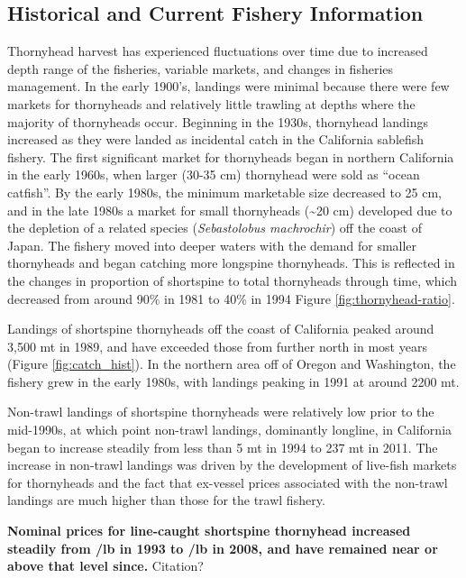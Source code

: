 \documentclass[11pt,
  english,
  letterpaper,
]{article}
\begin{document}
\hypertarget{historical-and-current-fishery-information}{%
\subsection{Historical and Current Fishery Information}\label{historical-and-current-fishery-information}}

Thornyhead harvest has experienced fluctuations over time due to increased depth range of the fisheries, variable markets, and changes in fisheries management. In the early 1900's, landings were minimal because there were few markets for thornyheads and relatively little trawling at depths where the majority of thornyheads occur. Beginning in the 1930s, thornyhead landings increased as they were landed as incidental catch in the California sablefish fishery. The first significant market for thornyheads began in northern California in the early 1960s, when larger (30-35 cm) thornyhead were sold as ``ocean catfish''. By the early 1980s, the minimum marketable size decreased to 25 cm, and in the late 1980s a market for small thornyheads (\textasciitilde20 cm) developed due to the depletion of a related species (\emph{Sebastolobus machrochir}) off the coast of Japan. The fishery moved into deeper waters with the demand for smaller thornyheads and began catching more longspine thornyheads. This is reflected in the changes in proportion of shortspine to total thornyheads through time, which decreased from around 90\% in 1981 to 40\% in 1994 Figure \ref{fig:thornyhead-ratio}.

Landings of shortspine thornyheads off the coast of California peaked around 3,500 mt in 1989, and have exceeded those from further north in most years (Figure \ref{fig:catch_hist}). In the northern area off of Oregon and Washington, the fishery grew in the early 1980s, with landings peaking in 1991 at around 2200 mt.

Non-trawl landings of shortspine thornyheads were relatively low prior to the mid-1990s, at which point non-trawl landings, dominantly longline, in California began to increase steadily from less than 5 mt in 1994 to 237 mt in 2011. The increase in non-trawl landings was driven by the development of live-fish markets for thornyheads and the fact that ex-vessel prices associated with the non-trawl landings are much higher than those for the trawl fishery.

\textbf{Nominal prices for line-caught shortspine thornyhead increased steadily from /lb in 1993 to /lb in 2008, and have remained near or above that level since.} Citation?
\end{document}
